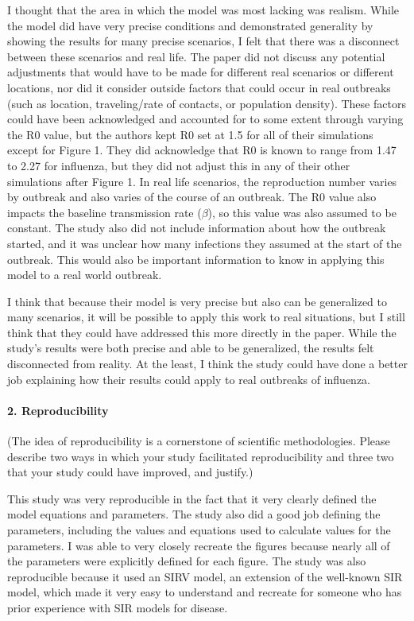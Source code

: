 \documentclass[]{article}
\let\oldparagraph\paragraph
\renewcommand{\paragraph}[1]{\oldparagraph{#1}\mbox{}}
\begin{document}
I thought that the area in which the model was most lacking was realism.
While the model did have very precise conditions and demonstrated
generality by showing the results for many precise scenarios, I felt
that there was a disconnect between these scenarios and real life. The
paper did not discuss any potential adjustments that would have to be
made for different real scenarios or different locations, nor did it
consider outside factors that could occur in real outbreaks (such as
location, traveling/rate of contacts, or population density). These
factors could have been acknowledged and accounted for to some extent
through varying the R0 value, but the authors kept R0 set at 1.5 for all
of their simulations except for Figure 1. They did acknowledge that R0
is known to range from 1.47 to 2.27 for influenza, but they did not
adjust this in any of their other simulations after Figure 1. In real
life scenarios, the reproduction number varies by outbreak and also
varies of the course of an outbreak. The R0 value also impacts the
baseline transmission rate (\(\beta\)), so this value was also assumed
to be constant. The study also did not include information about how the
outbreak started, and it was unclear how many infections they assumed at
the start of the outbreak. This would also be important information to
know in applying this model to a real world outbreak.

I think that because their model is very precise but also can be
generalized to many scenarios, it will be possible to apply this work to
real situations, but I still think that they could have addressed this
more directly in the paper. While the study's results were both precise
and able to be generalized, the results felt disconnected from reality.
At the least, I think the study could have done a better job explaining
how their results could apply to real outbreaks of influenza.

\hypertarget{reproducibility}{%
\paragraph{2. Reproducibility}\label{reproducibility}}

(The idea of reproducibility is a cornerstone of scientific
methodologies. Please describe two ways in which your study facilitated
reproducibility and three two that your study could have improved, and
justify.)

This study was very reproducible in the fact that it very clearly
defined the model equations and parameters. The study also did a good
job defining the parameters, including the values and equations used to
calculate values for the parameters. I was able to very closely recreate
the figures because nearly all of the parameters were explicitly defined
for each figure. The study was also reproducible because it used an SIRV
model, an extension of the well-known SIR model, which made it very easy
to understand and recreate for someone who has prior experience with SIR
models for disease.
\end{document}

